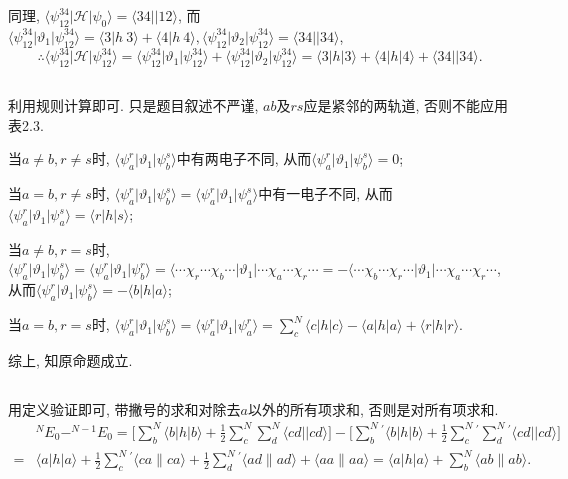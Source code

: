 \documentclass[UTF8]{ctexart}
\newcommand\lr[2]{\langle#1\|#2\rangle}
\newcommand\lrs[3]{\langle#1|#2|#3\rangle}
\newcommand\psum[2]{\sum_{#1}^{#2}{^\prime}}
\begin{document}
		同理, $\langle \psi_{12}^{34} | \mathscr{H} | \psi_0 \rangle = \langle 34 || 12 \rangle$, 而$\langle \psi_{12}^{34} | \vartheta_1 | \psi_{12}^{34} \rangle = \langle 3 | h \ 3 \rangle + \langle 4 | h \ 4 \rangle, \langle \psi_{12}^{34} | \vartheta_2 | \psi_{12}^{34} \rangle = \langle 34 || 34 \rangle$, 
		\[
			\therefore \langle \psi_{12}^{34} | \mathscr{H} | \psi_{12}^{34} \rangle = \langle \psi_{12}^{34} | \vartheta_1 | \psi_{12}^{34} \rangle + \langle \psi_{12}^{34} | \vartheta_2 | \psi_{12}^{34} \rangle = \langle 3 | h | 3 \rangle + \langle 4 | h | 4 \rangle + \langle 34 || 34 \rangle.
		\]
	
	\subsection{}
		利用规则计算即可. 只是题目叙述不严谨, $ab$及$rs$应是紧邻的两轨道, 否则不能应用表2.3. 
		
		当$a \neq b, r \neq s$时, $\langle \psi_a^r | \vartheta_1 | \psi_b^s \rangle$中有两电子不同, 从而$\langle \psi_a^r | \vartheta_1 | \psi_b^s \rangle = 0$; 
		
		当$a = b, r \neq s$时, $\langle \psi_a^r | \vartheta_1 | \psi_b^s \rangle = \langle \psi_a^r | \vartheta_1 | \psi_a^s \rangle$中有一电子不同, 从而$\langle \psi_a^r | \vartheta_1 | \psi_a^s \rangle = \langle r | h | s \rangle$; 
		
		当$a \neq b, r = s$时, $\langle \psi_a^r | \vartheta_1 | \psi_b^s \rangle = \langle \psi_a^r | \vartheta_1 | \psi_b^r \rangle = \langle \cdots \chi_r \cdots \chi_b \cdots | \vartheta_1 | \cdots \chi_a \cdots \chi_r \cdots = - \langle \cdots \chi_b \cdots \chi_r \cdots | \vartheta_1 | \cdots \chi_a \cdots \chi_r \cdots$, 从而$\langle \psi_a^r | \vartheta_1 | \psi_b^s \rangle = -\langle b | h | a \rangle$; 
		
		当$a = b, r = s$时, $\langle \psi_a^r | \vartheta_1 | \psi_b^s \rangle = \langle \psi_a^r | \vartheta_1 | \psi_a^r \rangle = \sum_c^N \langle c | h | c \rangle - \langle a | h | a \rangle + \langle r | h | r \rangle$. 
		
		综上, 知原命题成立. 
	
	\subsection{}
		用定义验证即可, 带撇号的求和对除去$a$以外的所有项求和, 否则是对所有项求和. 
		\[
		\begin{aligned}
			& ^NE_0 - ^{N-1}E_0 = \Big[ \sum_b^N \langle b | h | b \rangle + \frac{1}{2} \sum_c^N \sum_d^N \langle cd || cd \rangle \Big] - 
			\Big[ \psum{b}{N} \langle b | h | b \rangle + \frac{1}{2} \psum{c}{N} \psum{d}{N} \langle cd || cd \rangle \Big] \\
			=& \lrs{a}{h}{a} + \frac{1}{2} \psum{c}{N} \lr{ca}{ca} + \frac{1}{2} \psum{d}{N} \lr{ad}{ad} + \lr{aa}{aa} = \lrs{a}{h}{a} + \sum_b^N \lr{ab}{ab}.
		\end{aligned}
		\]
	
\end{document}
